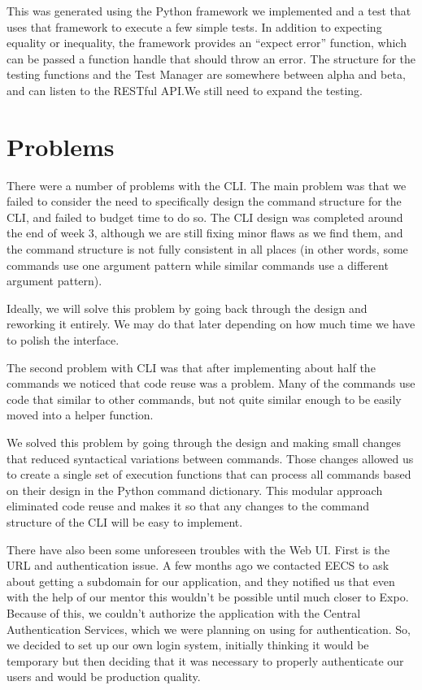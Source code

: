 \documentclass[10pt,draftclsnofoot,onecolumn]{IEEEtran}
\begin{document}
This was generated using the Python framework we implemented and a test that
uses that framework to execute a few simple tests. In addition to expecting
equality or inequality, the framework provides an “expect error” function,
which can be passed a function handle that should throw an error. The
structure for the testing functions and the Test Manager are somewhere between
alpha and beta, and can listen to the RESTful API.We still need to expand the
testing.

\section{Problems}

There were a number of problems with the CLI. The main problem was that we
failed to consider the need to specifically design the command structure for
the CLI, and failed to budget time to do so. The CLI design was completed
around the end of week 3, although we are still fixing minor flaws as we find
them, and the command structure is not fully consistent in all places (in other
words, some commands use one argument pattern while similar commands use a
different argument pattern). 

Ideally, we will solve this problem by going back through the design and
reworking it entirely. We may do that later depending on how much time we have
to polish the interface. 

The second problem with CLI was that after implementing about half the commands
we noticed that code reuse was a problem. Many of the commands use code that
similar to other commands, but not quite similar enough to be easily moved into
a helper function.

We solved this problem by going through the design and making small changes
that reduced syntactical variations between commands. Those changes allowed us
to create a single set of execution functions that can process all commands
based on their design in the Python command dictionary. This modular approach
eliminated code reuse and makes it so that any changes to the command structure
of the CLI will be easy to implement.  

There have also been some unforeseen troubles with the Web UI. First is the URL
and authentication issue.  A few months  ago we contacted EECS to ask about
getting a subdomain for our application, and they notified us that even with
the help of our mentor this wouldn’t be possible until much closer to Expo.
Because of this, we couldn’t authorize the application with the Central
Authentication Services, which we were planning on using for authentication.
So, we decided to set up our own login system, initially thinking it would be
temporary but then deciding that it was necessary to properly authenticate our
users and would be production quality.  
\end{document}
